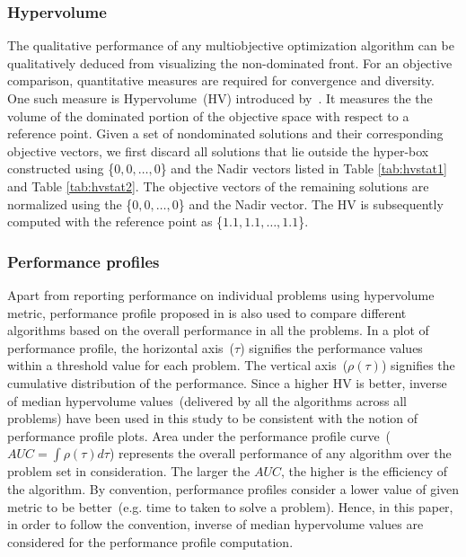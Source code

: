 \subsubsection{Hypervolume} The qualitative performance of any multiobjective optimization
algorithm can be qualitatively deduced from visualizing the non-dominated front. For an objective
comparison, quantitative measures are required for convergence and diversity. One such measure is
Hypervolume~(HV) introduced by~\cite{zitzler1999multiobjective}. It measures the the volume of the
dominated portion of the objective space with respect to a reference point. Given a set of nondominated solutions and their corresponding objective vectors, we first discard all solutions that lie outside the hyper-box constructed using \{$0,0,\dots,0$\} and the Nadir vectors listed in Table \ref{tab:hvstat1} and Table \ref{tab:hvstat2}. The objective vectors of the remaining solutions are normalized using the \{$0,0,\dots,0$\} and the Nadir vector. The HV is subsequently computed with the reference point as \{$1.1,1.1,\dots,1.1$\}. 

\subsubsection{Performance profiles} Apart from reporting performance on individual problems using hypervolume metric, performance
profile proposed in \cite{dolan2002perf} is also used to compare different algorithms based on the overall performance in all the problems. In a plot of performance profile, the horizontal
axis~($\tau$) signifies the performance values within a threshold value for each problem. The
vertical axis~($\rho(\tau)$) signifies the cumulative distribution of the performance. Since a
higher HV is better, inverse of median hypervolume values~(delivered by all the algorithms across
all problems) have been used in this study to be consistent with the notion of performance profile
plots. Area under the performance profile curve~($AUC = \int{\rho(\tau)d\tau}$) represents the overall
performance of any algorithm over the problem set in consideration. The larger the $AUC$, the higher
is the efficiency of the algorithm. By convention, performance profiles consider a lower value of given metric to be better~(e.g. time to taken to solve a problem). Hence, in this paper,  in order to follow the convention, inverse of median hypervolume values are considered for the performance profile computation.

